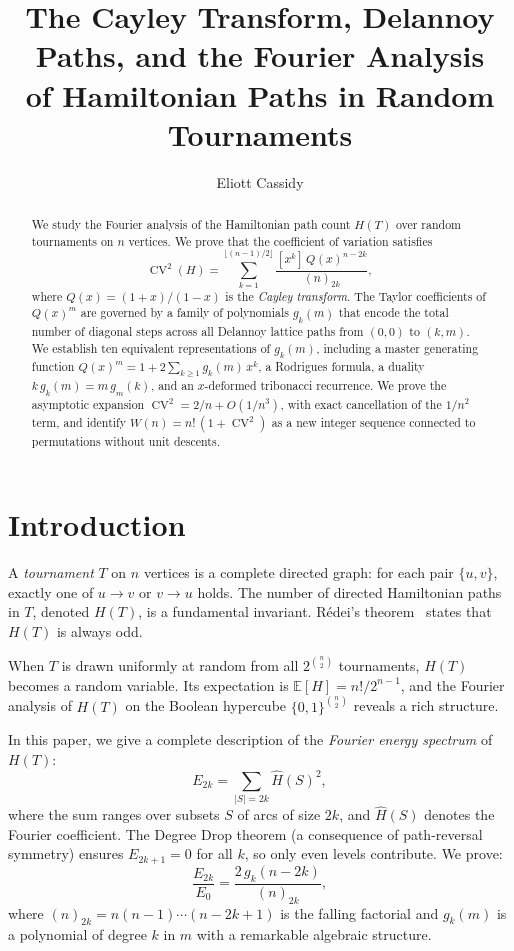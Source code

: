 \documentclass[11pt]{amsart}
\title{The Cayley Transform, Delannoy Paths, and the Fourier Analysis\\of Hamiltonian Paths in Random Tournaments}
\author{Eliott Cassidy}
\theoremstyle{definition}
\DeclareMathOperator{\CV}{CV}
\begin{document}
\begin{abstract}
We study the Fourier analysis of the Hamiltonian path count $H(T)$ over random tournaments on $n$ vertices. We prove that the coefficient of variation satisfies
\[
\CV^2(H) = \sum_{k=1}^{\lfloor(n-1)/2\rfloor} \frac{[x^k]\, Q(x)^{n-2k}}{(n)_{2k}},
\]
where $Q(x) = (1+x)/(1-x)$ is the \emph{Cayley transform}. The Taylor coefficients of $Q(x)^m$ are governed by a family of polynomials $g_k(m)$ that encode the total number of diagonal steps across all Delannoy lattice paths from $(0,0)$ to $(k,m)$. We establish ten equivalent representations of $g_k(m)$, including a master generating function $Q(x)^m = 1 + 2\sum_{k \geq 1} g_k(m)\, x^k$, a Rodrigues formula, a duality $k\, g_k(m) = m\, g_m(k)$, and an $x$-deformed tribonacci recurrence. We prove the asymptotic expansion $\CV^2 = 2/n + O(1/n^3)$, with exact cancellation of the $1/n^2$ term, and identify $W(n) = n!\,(1 + \CV^2)$ as a new integer sequence connected to permutations without unit descents.
\end{abstract}

\maketitle

\section{Introduction}

A \emph{tournament} $T$ on $n$ vertices is a complete directed graph: for each pair $\{u,v\}$, exactly one of $u \to v$ or $v \to u$ holds. The number of directed Hamiltonian paths in $T$, denoted $H(T)$, is a fundamental invariant. R\'edei's theorem~\cite{redei1934} states that $H(T)$ is always odd.

When $T$ is drawn uniformly at random from all $2^{\binom{n}{2}}$ tournaments, $H(T)$ becomes a random variable. Its expectation is $\mathbb{E}[H] = n!/2^{n-1}$, and the Fourier analysis of $H(T)$ on the Boolean hypercube $\{0,1\}^{\binom{n}{2}}$ reveals a rich structure.

In this paper, we give a complete description of the \emph{Fourier energy spectrum} of $H(T)$:
\[
E_{2k} = \sum_{|S|=2k} \widehat{H}(S)^2,
\]
where the sum ranges over subsets $S$ of arcs of size $2k$, and $\widehat{H}(S)$ denotes the Fourier coefficient. The Degree Drop theorem (a consequence of path-reversal symmetry) ensures $E_{2k+1} = 0$ for all $k$, so only even levels contribute. We prove:
\[
\frac{E_{2k}}{E_0} = \frac{2\, g_k(n-2k)}{(n)_{2k}},
\]
where $(n)_{2k} = n(n-1)\cdots(n-2k+1)$ is the falling factorial and $g_k(m)$ is a polynomial of degree $k$ in $m$ with a remarkable algebraic structure.
\end{document}
